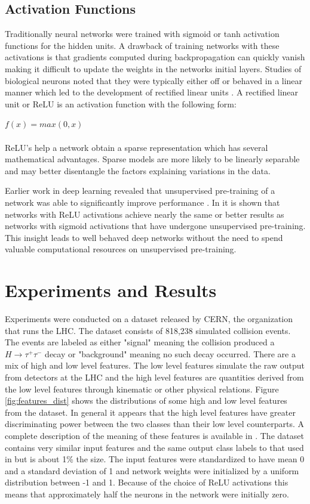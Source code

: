 \documentclass[12pt,letterpaper]{article}
\begin{document}
\subsection{Activation Functions}
Traditionally neural networks were trained with sigmoid or tanh activation functions for the hidden units.  A drawback of training networks with these activations is that gradients computed during backpropagation can quickly vanish making it difficult to update the weights in the networks initial layers.  Studies of biological neurons noted that they were typically either off or behaved in a linear manner which led to the development of rectified linear units  \cite{AISTATS2011_GlorotBB11}. A rectified linear unit or ReLU is an activation function with the following form:

$f(x) = max(0,x)$
\\
\\
ReLU's help a network obtain a sparse representation which has several mathematical advantages. Sparse models are more likely to be linearly separable and may better disentangle the factors explaining variations in the data.

Earlier work in deep learning revealed that unsupervised pre-training of a network was able to significantly improve performance \cite{Vincent:2010:SDA:1756006.1953039}.  In \cite{AISTATS2011_GlorotBB11} it is shown that networks with ReLU activations achieve nearly the same or better results as networks with sigmoid activations that have undergone unsupervised pre-training.  This insight leads to well behaved deep networks without the need to spend valuable computational resources on unsupervised pre-training.

\section{Experiments and Results}

Experiments were conducted on a dataset released by CERN, the organization that runs the LHC.  The dataset consists of 818,238 simulated collision events.  The events are labeled as either "signal" meaning the collision produced a $H \rightarrow \tau^+ \tau^-$ decay or "background" meaning no such decay occurred.  There are a mix of high and low level features.  The low level features simulate the raw output from detectors at the LHC and the high level features are quantities derived from the low level features through kinematic or other physical relations.  Figure \ref{fig:features_dist} shows the distributions of some high and low level features from the dataset.  In general it appears that the high level features have greater discriminating power between the two classes than their low level counterparts.  A complete description of the meaning of these features is available in \cite{pmlr-v42-cowa14}.  The dataset contains very similar input features and the same output class labels to that used in \cite{Baldi:2014pta} but is about 1\% the size.  The input features were standardized to have mean 0 and a standard deviation of 1 and network weights were initialized by a uniform distribution between -1 and 1.  Because of the choice of ReLU activations this means that approximately half the neurons in the network were initially zero.
\end{document}
